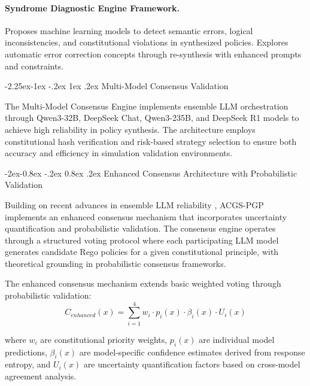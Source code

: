 \documentclass[manuscript,screen,9pt]{acmart}
\makeatletter
\renewcommand\subsection{\@startsection{subsection}{2}{\z@}%
  {-2.25ex\@plus -1ex \@minus -.2ex}%
  {1ex \@plus .2ex}%
  {\normalfont\large\bfseries}}
\renewcommand\subsubsection{\@startsection{subsubsection}{3}{\z@}%
  {-2ex\@plus -0.8ex \@minus -.2ex}%
  {0.8ex \@plus .2ex}%
  {\normalfont\normalsize\bfseries}}
\makeatother
\begin{document}
\paragraph{Syndrome Diagnostic Engine Framework.} Proposes machine learning models to detect semantic errors, logical inconsistencies, and constitutional violations in synthesized policies. Explores automatic error correction concepts through re-synthesis with enhanced prompts and constraints.

\subsection{Multi-Model Consensus Validation}
\label{subsec:multi_model_consensus}

The Multi-Model Consensus Engine implements ensemble LLM orchestration through Qwen3-32B, DeepSeek Chat, Qwen3-235B, and DeepSeek R1 models to achieve high reliability in policy synthesis. The architecture employs constitutional hash verification and risk-based strategy selection to ensure both accuracy and efficiency in simulation validation environments.

\subsubsection{Enhanced Consensus Architecture with Probabilistic Validation}
\label{subsubsec:enhanced_consensus}

Building on recent advances in ensemble LLM reliability \citep{Naik2024ProbabilisticConsensus}, ACGS-PGP implements an enhanced consensus mechanism that incorporates uncertainty quantification and probabilistic validation. The consensus engine operates through a structured voting protocol where each participating LLM model generates candidate Rego policies for a given constitutional principle, with theoretical grounding in probabilistic consensus frameworks.

The enhanced consensus mechanism extends basic weighted voting through probabilistic validation:
\begin{equation}
C_{enhanced}(x) = \sum_{i=1}^{4} w_i \cdot p_i(x) \cdot \beta_i(x) \cdot U_i(x)
\end{equation}

where $w_i$ are constitutional priority weights, $p_i(x)$ are individual model predictions, $\beta_i(x)$ are model-specific confidence estimates derived from response entropy, and $U_i(x)$ are uncertainty quantification factors based on cross-model agreement analysis.
\end{document}
